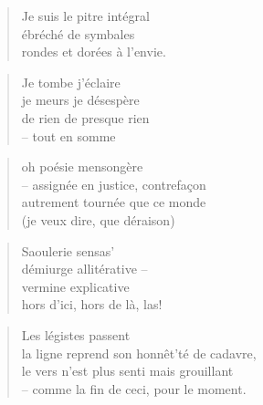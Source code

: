   \begin{verse}
    Je suis le pitre intégral\\
    ébréché de symbales\\
    rondes et dorées à l’envie.
  \end{verse}
  \begin{verse}
    Je tombe j’éclaire\\
    je meurs je désespère\\
    de rien de presque rien\\
    -- tout en somme
  \end{verse}
  \begin{verse}
    oh poésie mensongère\\
    -- assignée en justice, contrefaçon\\
    autrement tournée que ce monde\\
    (je veux dire, que déraison)
  \end{verse}
  \begin{verse}
    Saoulerie sensas’\\
    démiurge allitérative --\\
    vermine explicative\\
    hors d’ici, hors de là, las!
  \end{verse}
  \begin{verse}
    Les légistes passent\\
    la ligne reprend son honnêt’té de cadavre,\\
    le vers n’est plus senti mais grouillant\\
    -- comme la fin de ceci, pour le moment.
  \end{verse}

